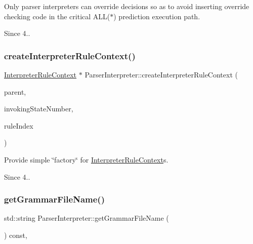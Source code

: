Only parser interpreters can override decisions so as to avoid inserting override checking code in the critical A\+L\+L($\ast$) prediction execution path.

\begin{DoxySince}{Since}
4.. 
\end{DoxySince}
\mbox{\label{classantlr4_1_1ParserInterpreter_a0ca4deabd05eb912676a73827edc83a1}} 
\subsubsection{\texorpdfstring{create\+Interpreter\+Rule\+Context()}{createInterpreterRuleContext()}}
{\footnotesize\ttfamily \hyperlink{classantlr4_1_1InterpreterRuleContext}{Interpreter\+Rule\+Context} $\ast$ Parser\+Interpreter\+::create\+Interpreter\+Rule\+Context (\begin{DoxyParamCaption}\item[{\hyperlink{classantlr4_1_1ParserRuleContext}{Parser\+Rule\+Context} $\ast$}]{parent,  }\item[{size\+\_\+t}]{invoking\+State\+Number,  }\item[{size\+\_\+t}]{rule\+Index }\end{DoxyParamCaption})\hspace{0.3cm}{\ttfamily [protected]}}

Provide simple \char`\"{}factory\char`\"{} for \hyperlink{classantlr4_1_1InterpreterRuleContext}{Interpreter\+Rule\+Context}\textquotesingle{}s. \begin{DoxySince}{Since}
4.. 
\end{DoxySince}
\mbox{\label{classantlr4_1_1ParserInterpreter_a14fc40b7791578d486eacffd2c5bb483}} 
\subsubsection{\texorpdfstring{get\+Grammar\+File\+Name()}{getGrammarFileName()}}
{\footnotesize\ttfamily std\+::string Parser\+Interpreter\+::get\+Grammar\+File\+Name (\begin{DoxyParamCaption}{ }\end{DoxyParamCaption}) const\hspace{0.3cm}{\ttfamily [override]}, {\ttfamily [virtual]}}



